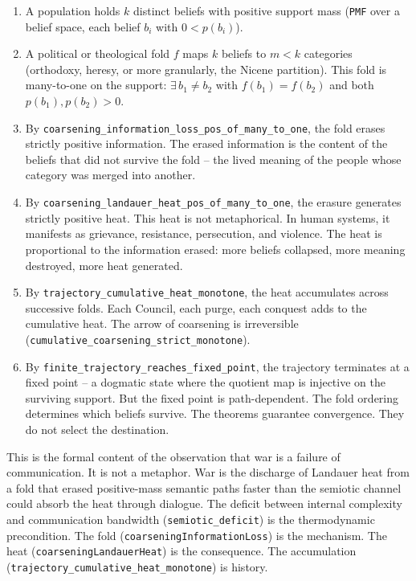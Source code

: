 \documentclass[
  11pt,
]{article}
\begin{document}
\begin{enumerate}
\def\labelenumi{\arabic{enumi}.}
\item
  A population holds \(k\) distinct beliefs with positive support mass
  (\texttt{PMF} over a belief space, each belief \(b_i\) with
  \(0 < p(b_i)\)).
\item
  A political or theological fold \(f\) maps \(k\) beliefs to \(m < k\)
  categories (orthodoxy, heresy, or more granularly, the Nicene
  partition). This fold is many-to-one on the support:
  \(\exists\, b_1 \neq b_2\) with \(f(b_1) = f(b_2)\) and both
  \(p(b_1), p(b_2) > 0\).
\item
  By \texttt{coarsening\_information\_loss\_pos\_of\_many\_to\_one}, the
  fold erases strictly positive information. The erased information is
  the content of the beliefs that did not survive the fold -- the lived
  meaning of the people whose category was merged into another.
\item
  By \texttt{coarsening\_landauer\_heat\_pos\_of\_many\_to\_one}, the
  erasure generates strictly positive heat. This heat is not
  metaphorical. In human systems, it manifests as grievance, resistance,
  persecution, and violence. The heat is proportional to the information
  erased: more beliefs collapsed, more meaning destroyed, more heat
  generated.
\item
  By \texttt{trajectory\_cumulative\_heat\_monotone}, the heat
  accumulates across successive folds. Each Council, each purge, each
  conquest adds to the cumulative heat. The arrow of coarsening is
  irreversible (\texttt{cumulative\_coarsening\_strict\_monotone}).
\item
  By \texttt{finite\_trajectory\_reaches\_fixed\_point}, the trajectory
  terminates at a fixed point -- a dogmatic state where the quotient map
  is injective on the surviving support. But the fixed point is
  path-dependent. The fold ordering determines which beliefs survive.
  The theorems guarantee convergence. They do not select the
  destination.
\end{enumerate}

This is the formal content of the observation that war is a failure of
communication. It is not a metaphor. War is the discharge of Landauer
heat from a fold that erased positive-mass semantic paths faster than
the semiotic channel could absorb the heat through dialogue. The deficit
between internal complexity and communication bandwidth
(\texttt{semiotic\_deficit}) is the thermodynamic precondition. The fold
(\texttt{coarseningInformationLoss}) is the mechanism. The heat
(\texttt{coarseningLandauerHeat}) is the consequence. The accumulation
(\texttt{trajectory\_cumulative\_heat\_monotone}) is history.
\end{document}
